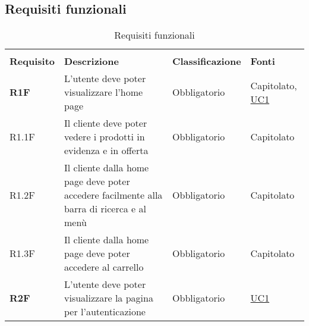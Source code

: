 \subsection{Requisiti funzionali}
\begin{center}
    \centering
    \renewcommand{\arraystretch}{1.8}
    \label{tab:RequisitiFunzionali}
    \begin{longtable}[!h]{p{50px} p{245px} p{75px} p{50px}}
        \rowcolor{white}\caption{Requisiti funzionali}                                                                                                                                                                                                                           \\
        \rowcolor{logo!70} \textbf{Requisito} & \textbf{Descrizione}                                                                                                                                   & \textbf{Classificazione} & \textbf{Fonti}                               \\
        \textbf{R1F}                          & L'utente deve poter visualizzare l'home page                                                                                                           & Obbligatorio             & Capitolato, \newline \hyperref[sec:UC1]{UC1} \\
        R1.1F                                 & Il cliente deve poter vedere i prodotti in evidenza e in offerta                                                                                       & Obbligatorio             & Capitolato                                   \\
        R1.2F                                 & Il cliente dalla home page deve poter accedere facilmente alla barra di ricerca e al menù                                                              & Obbligatorio             & Capitolato                                   \\
        R1.3F                                 & Il cliente dalla home page deve poter accedere al carrello                                                                                             & Obbligatorio             & Capitolato                                   \\
        \textbf{R2F}                          & L'utente deve poter visualizzare la pagina per l'autenticazione                                                                                        & Obbligatorio             & \hyperref[sec:UC1]{UC1}                      \\

\end{longtable}
\end{center}

